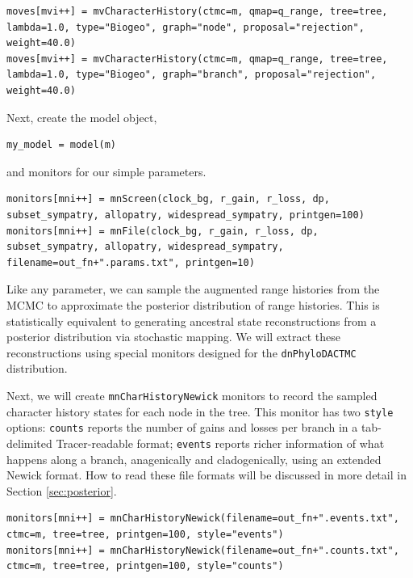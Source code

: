 \begin{snugshade}
\begin{lstlisting}
moves[mvi++] = mvCharacterHistory(ctmc=m, qmap=q_range, tree=tree, lambda=1.0, type="Biogeo", graph="node", proposal="rejection", weight=40.0)
moves[mvi++] = mvCharacterHistory(ctmc=m, qmap=q_range, tree=tree, lambda=1.0, type="Biogeo", graph="branch", proposal="rejection", weight=40.0)
\end{lstlisting}
\end{snugshade}

Next, create the model object,

\begin{snugshade}
\begin{lstlisting}
my_model = model(m)
\end{lstlisting}
\end{snugshade}

and monitors for our simple parameters.

\begin{snugshade}
\begin{lstlisting}
monitors[mni++] = mnScreen(clock_bg, r_gain, r_loss, dp, subset_sympatry, allopatry, widespread_sympatry, printgen=100)
monitors[mni++] = mnFile(clock_bg, r_gain, r_loss, dp, subset_sympatry, allopatry, widespread_sympatry, filename=out_fn+".params.txt", printgen=10)
\end{lstlisting}
\end{snugshade}

Like any parameter, we can sample the augmented range histories from the MCMC to approximate the posterior distribution of range histories.
This is statistically equivalent to generating ancestral state reconstructions from a posterior distribution via stochastic mapping.
We will extract these reconstructions using special monitors designed for the {\tt dnPhyloDACTMC} distribution.

Next, we will create {\tt mnCharHistoryNewick} monitors to record the sampled character history states for each node in the tree.
This monitor has two {\tt style} options: {\tt counts} reports the number of gains and losses per branch in a tab-delimited Tracer-readable format;  {\tt events} reports richer information of what happens along a branch, anagenically and cladogenically, using an extended Newick format.
How to read these file formats will be discussed in more detail in Section \ref{sec:posterior}.

\begin{snugshade}
\begin{lstlisting}
monitors[mni++] = mnCharHistoryNewick(filename=out_fn+".events.txt", ctmc=m, tree=tree, printgen=100, style="events")
monitors[mni++] = mnCharHistoryNewick(filename=out_fn+".counts.txt", ctmc=m, tree=tree, printgen=100, style="counts")

\end{lstlisting}
\end{snugshade}

